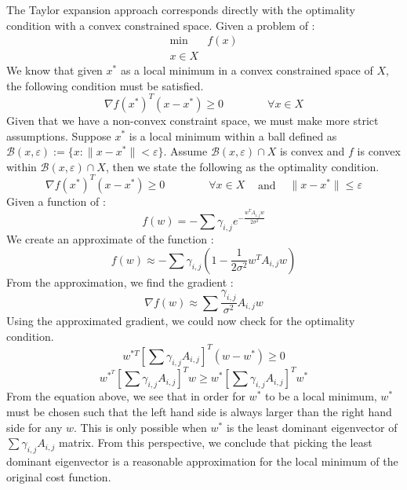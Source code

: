 \documentclass{article}
\newcommand{\assign}{:=}
\newcommand{\tmop}[1]{\ensuremath{\operatorname{#1}}}
\begin{document}
The Taylor expansion approach corresponds directly with the optimality
condition with a convex constrained space. Given a problem of :
\[ \begin{array}{ll}
     \min & f (x)\\
     x \in X & 
   \end{array} \]
We know that given $x^{\ast}$ as a local minimum in a convex constrained space
of $X$, the following condition must be satisfied.
\[ \nabla f (x^{\ast})^T  (x - x^{\ast}) \geq 0 \begin{array}{lllll}
     &  &  &  & 
   \end{array} \forall x \in X \]
Given that we have a non-convex constraint space, we must make more strict
assumptions. Suppose $x^{\ast}$ is a local minimum within a ball defined as
$\mathcal{B} (x, \varepsilon) \assign \{x : \|x - x^{\ast} \|< \varepsilon\}$.
Assume $\mathcal{B} (x, \varepsilon) \cap X$ is convex and $f$ is convex
within $\mathcal{B} (x, \varepsilon) \cap X$, then we state the following as
the optimality condition.
\[ \nabla f (x^{\ast})^T  (x - x^{\ast}) \geq 0 \begin{array}{lllll}
     &  &  &  & 
   \end{array} \forall x \in X \begin{array}{lll}
     & \tmop{and} & 
   \end{array} \|x - x^{\ast} \| \leq \varepsilon \]
Given a function of :
\[ f (w) = - \sum \gamma_{i, j} e^{- \frac{w^T A_{i, j} w}{2 \sigma^2}} \]
We create an approximate of the function :
\[ f (w) \approx - \sum \gamma_{i, j}  \left( 1 - \frac{1}{2 \sigma^2} w^T
   A_{i, j} w \right) \]
From the approximation, we find the gradient :
\[ \nabla f (w) \approx \sum \frac{\gamma_{i, j}}{\sigma^2} A_{i, j} w \]
Using the approximated gradient, we could now check for the optimality
condition.
\[ w^{\ast T} \left[ \sum \gamma_{i, j} A_{i, j} \right]^T  (w - w^{\ast})
   \geq 0 \]
\[ w^{\ast^T} \left[ \sum \gamma_{i, j} A_{i, j} \right]^T w \geq w^{\ast}
   \left[ \sum \gamma_{i, j} A_{i, j} \right]^T w^{\ast} \]
From the equation above, we see that in order for $w^{\ast}$ to be a local
minimum, $w^{\ast}$ must be chosen such that the left hand side is always
larger than the right hand side for any $w$. This is only possible when
$w^{\ast}$ is the least dominant eigenvector of $\sum \gamma_{i, j} A_{i, j}$
matrix. From this perspective, we conclude that picking the least dominant
eigenvector is a reasonable approximation for the local minimum of the
original cost function.
\end{document}
